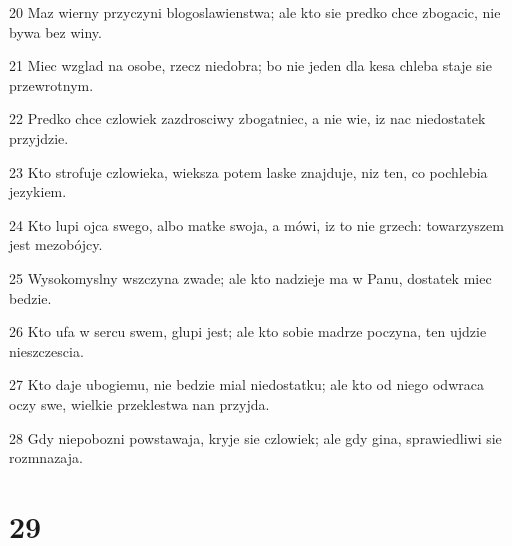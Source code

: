 \par 20 Maz wierny przyczyni blogoslawienstwa; ale kto sie predko chce zbogacic, nie bywa bez winy.
\par 21 Miec wzglad na osobe, rzecz niedobra; bo nie jeden dla kesa chleba staje sie przewrotnym.
\par 22 Predko chce czlowiek zazdrosciwy zbogatniec, a nie wie, iz nac niedostatek przyjdzie.
\par 23 Kto strofuje czlowieka, wieksza potem laske znajduje, niz ten, co pochlebia jezykiem.
\par 24 Kto lupi ojca swego, albo matke swoja, a mówi, iz to nie grzech: towarzyszem jest mezobójcy.
\par 25 Wysokomyslny wszczyna zwade; ale kto nadzieje ma w Panu, dostatek miec bedzie.
\par 26 Kto ufa w sercu swem, glupi jest; ale kto sobie madrze poczyna, ten ujdzie nieszczescia.
\par 27 Kto daje ubogiemu, nie bedzie mial niedostatku; ale kto od niego odwraca oczy swe, wielkie przeklestwa nan przyjda.
\par 28 Gdy niepobozni powstawaja, kryje sie czlowiek; ale gdy gina, sprawiedliwi sie rozmnazaja.

\chapter{29}

